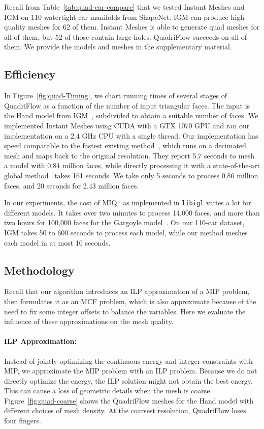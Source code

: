 Recall from Table~\ref{tab:quad-car-compare} that we tested Instant Meshes and IGM on 110 watertight car manifolds from ShapeNet. IGM can produce high-quality meshes for 62 of them. Instant Meshes is able to generate quad meshes for all of them, but 52 of those contain large holes. QuadriFlow succeeds on all of them. We provide the models and meshes in the supplementary material.

\subsection{Efficiency}

In Figure~\ref{fig:quad-Timing}, we chart running times of several stages of QuadriFlow as a function of the number of input triangular faces. The input is the Hand model from IGM~\cite{bommes2013integer}, subdivided to obtain a suitable number of faces. We implemented Instant Meshes using CUDA with a GTX 1070 GPU and ran our implementation on a 2.4 GHz CPU with a single thread. Our implementation has speed comparable to the fastest existing method~\cite{ebke2016interactively}, which runs on a decimated mesh and maps back to the original resolution. They report 5.7 seconds to mesh a model with 0.84 million faces, while directly processing it with a state-of-the-art global method~\cite{ebke2014level} takes 161 seconds. We take only 5 seconds to process 0.86 million faces, and 20 seconds for 2.43 million faces.

In our experiments, the cost of MIQ~\cite{bommes2009mixed} as implemented in \texttt{libigl} varies a lot for different models. It takes over two minutes to process 14,000 faces, and more than two hours for 100,000 faces for the Gargoyle model~\cite{tarini2010practical}. On our 110-car dataset, IGM takes 50 to 600 seconds to process each model, while our method meshes each model in at most 10 seconds.

\subsection{Methodology}
\label{sec:quad-methodology}

Recall that our algorithm introduces an ILP approximation of a MIP problem, then formulates it as an MCF problem, which is also approximate because of the need to fix some integer offsets to balance the variables. Here we evaluate the influence of these approximations on the mesh quality.

\paragraph*{ILP Approximation:} Instead of jointly optimizing the continuous energy and integer constraints with MIP, we approximate the MIP problem with an ILP problem. Because we do not directly optimize the energy, the ILP solution might not obtain the best energy. This can cause a loss of geometric details when the mesh is coarse. Figure~\ref{fig:quad-coarse} shows the QuadriFlow meshes for the Hand model with different choices of mesh density. At the coarsest resolution, QuadriFlow loses four fingers.

